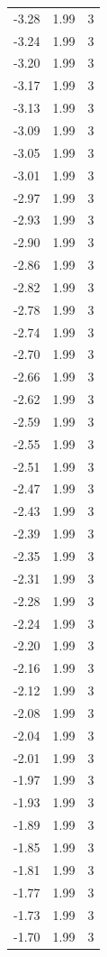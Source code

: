 \begin{longtable}{lrr}
  -3.28 & 1.99 & 3 \\
  -3.24 & 1.99 & 3 \\
  -3.20 & 1.99 & 3 \\
  -3.17 & 1.99 & 3 \\
  -3.13 & 1.99 & 3 \\
  -3.09 & 1.99 & 3 \\
  -3.05 & 1.99 & 3 \\
  -3.01 & 1.99 & 3 \\
  -2.97 & 1.99 & 3 \\
  -2.93 & 1.99 & 3 \\
  -2.90 & 1.99 & 3 \\
  -2.86 & 1.99 & 3 \\
  -2.82 & 1.99 & 3 \\
  -2.78 & 1.99 & 3 \\
  -2.74 & 1.99 & 3 \\
  -2.70 & 1.99 & 3 \\
  -2.66 & 1.99 & 3 \\
  -2.62 & 1.99 & 3 \\
  -2.59 & 1.99 & 3 \\
  -2.55 & 1.99 & 3 \\
  -2.51 & 1.99 & 3 \\
  -2.47 & 1.99 & 3 \\
  -2.43 & 1.99 & 3 \\
  -2.39 & 1.99 & 3 \\
  -2.35 & 1.99 & 3 \\
  -2.31 & 1.99 & 3 \\
  -2.28 & 1.99 & 3 \\
  -2.24 & 1.99 & 3 \\
  -2.20 & 1.99 & 3 \\
  -2.16 & 1.99 & 3 \\
  -2.12 & 1.99 & 3 \\
  -2.08 & 1.99 & 3 \\
  -2.04 & 1.99 & 3 \\
  -2.01 & 1.99 & 3 \\
  -1.97 & 1.99 & 3 \\
  -1.93 & 1.99 & 3 \\
  -1.89 & 1.99 & 3 \\
  -1.85 & 1.99 & 3 \\
  -1.81 & 1.99 & 3 \\
  -1.77 & 1.99 & 3 \\
  -1.73 & 1.99 & 3 \\
  -1.70 & 1.99 & 3 \\

\end{longtable}
